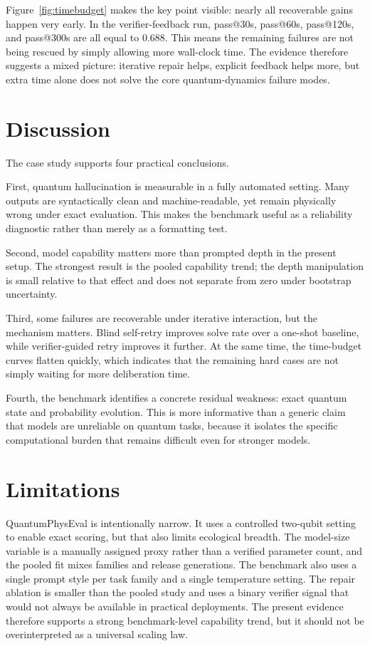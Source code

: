 \documentclass[11pt]{article}
\begin{document}
Figure~\ref{fig:timebudget} makes the key point visible: nearly all recoverable gains happen very early. In the verifier-feedback run, pass@30s, pass@60s, pass@120s, and pass@300s are all equal to 0.688. This means the remaining failures are not being rescued by simply allowing more wall-clock time. The evidence therefore suggests a mixed picture: iterative repair helps, explicit feedback helps more, but extra time alone does not solve the core quantum-dynamics failure modes.

\section{Discussion}
The case study supports four practical conclusions.

First, quantum hallucination is measurable in a fully automated setting. Many outputs are syntactically clean and machine-readable, yet remain physically wrong under exact evaluation. This makes the benchmark useful as a reliability diagnostic rather than merely as a formatting test.

Second, model capability matters more than prompted depth in the present setup. The strongest result is the pooled capability trend; the depth manipulation is small relative to that effect and does not separate from zero under bootstrap uncertainty.

Third, some failures are recoverable under iterative interaction, but the mechanism matters. Blind self-retry improves solve rate over a one-shot baseline, while verifier-guided retry improves it further. At the same time, the time-budget curves flatten quickly, which indicates that the remaining hard cases are not simply waiting for more deliberation time.

Fourth, the benchmark identifies a concrete residual weakness: exact quantum state and probability evolution. This is more informative than a generic claim that models are unreliable on quantum tasks, because it isolates the specific computational burden that remains difficult even for stronger models.

\section{Limitations}
QuantumPhysEval is intentionally narrow. It uses a controlled two-qubit setting to enable exact scoring, but that also limits ecological breadth. The model-size variable is a manually assigned proxy rather than a verified parameter count, and the pooled fit mixes families and release generations. The benchmark also uses a single prompt style per task family and a single temperature setting. The repair ablation is smaller than the pooled study and uses a binary verifier signal that would not always be available in practical deployments. The present evidence therefore supports a strong benchmark-level capability trend, but it should not be overinterpreted as a universal scaling law.
\end{document}
